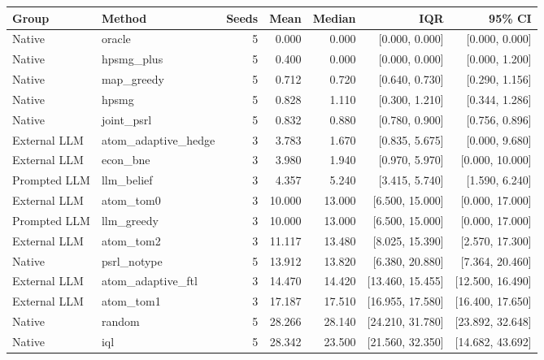 \begin{tabular}{llrrrrr}
\toprule
Group & Method & Seeds & Mean & Median & IQR & 95\% CI \\
\midrule
Native & oracle & 5 & 0.000 & 0.000 & [0.000, 0.000] & [0.000, 0.000] \\
Native & hpsmg\_plus & 5 & 0.400 & 0.000 & [0.000, 0.000] & [0.000, 1.200] \\
Native & map\_greedy & 5 & 0.712 & 0.720 & [0.640, 0.730] & [0.290, 1.156] \\
Native & hpsmg & 5 & 0.828 & 1.110 & [0.300, 1.210] & [0.344, 1.286] \\
Native & joint\_psrl & 5 & 0.832 & 0.880 & [0.780, 0.900] & [0.756, 0.896] \\
External LLM & atom\_adaptive\_hedge & 3 & 3.783 & 1.670 & [0.835, 5.675] & [0.000, 9.680] \\
External LLM & econ\_bne & 3 & 3.980 & 1.940 & [0.970, 5.970] & [0.000, 10.000] \\
Prompted LLM & llm\_belief & 3 & 4.357 & 5.240 & [3.415, 5.740] & [1.590, 6.240] \\
External LLM & atom\_tom0 & 3 & 10.000 & 13.000 & [6.500, 15.000] & [0.000, 17.000] \\
Prompted LLM & llm\_greedy & 3 & 10.000 & 13.000 & [6.500, 15.000] & [0.000, 17.000] \\
External LLM & atom\_tom2 & 3 & 11.117 & 13.480 & [8.025, 15.390] & [2.570, 17.300] \\
Native & psrl\_notype & 5 & 13.912 & 13.820 & [6.380, 20.880] & [7.364, 20.460] \\
External LLM & atom\_adaptive\_ftl & 3 & 14.470 & 14.420 & [13.460, 15.455] & [12.500, 16.490] \\
External LLM & atom\_tom1 & 3 & 17.187 & 17.510 & [16.955, 17.580] & [16.400, 17.650] \\
Native & random & 5 & 28.266 & 28.140 & [24.210, 31.780] & [23.892, 32.648] \\
Native & iql & 5 & 28.342 & 23.500 & [21.560, 32.350] & [14.682, 43.692] \\
\bottomrule
\end{tabular}
